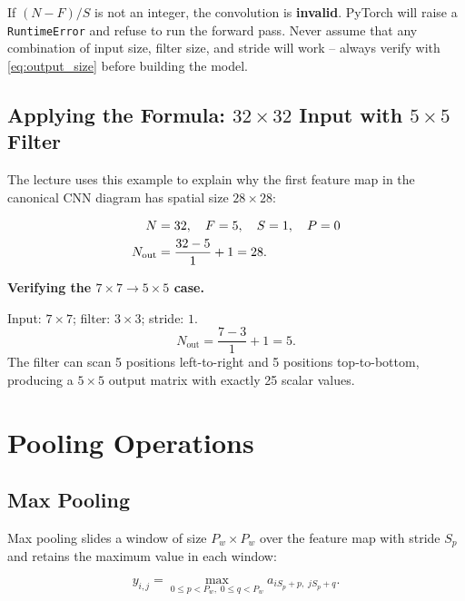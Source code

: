 \documentclass[12pt,a4paper]{article}
\begin{document}
\begin{warningbox}
If $(N-F)/S$ is not an integer, the convolution is \textbf{invalid}.  PyTorch
will raise a \texttt{RuntimeError} and refuse to run the forward pass.
Never assume that any combination of input size, filter size, and stride will
work -- always verify with \cref{eq:output_size} before building the model.
\end{warningbox}

\subsection{Applying the Formula: $32\times32$ Input with $5\times5$ Filter}
\label{subsec:formula_32}

The lecture uses this example to explain why the first feature map in the
canonical CNN diagram has spatial size $28\times28$:

\begin{align}
  N &= 32, \quad F = 5, \quad S = 1, \quad P = 0 \notag \\
  N_{\text{out}} &= \frac{32 - 5}{1} + 1 = 28.
  \label{eq:32to28}
\end{align}

\begin{example}
\textbf{Verifying the $7\times7 \to 5\times5$ case.}

Input: $7\times7$; filter: $3\times3$; stride: $1$.
\[
  N_{\text{out}} = \frac{7 - 3}{1} + 1 = 5.
\]
The filter can scan 5 positions left-to-right and 5 positions top-to-bottom,
producing a $5\times5$ output matrix with exactly 25 scalar values.
\end{example}

\section{Pooling Operations}
\label{sec:pooling}

\subsection{Max Pooling}
\label{subsec:max_pool}

Max pooling slides a window of size $P_w \times P_w$ over the feature map
with stride $S_p$ and retains the maximum value in each window:

\begin{equation}
  y_{i,j} = \max_{0 \le p < P_w,\; 0 \le q < P_w}
             a_{iS_p + p,\; jS_p + q}.
  \label{eq:maxpool}
\end{equation}
\end{document}
